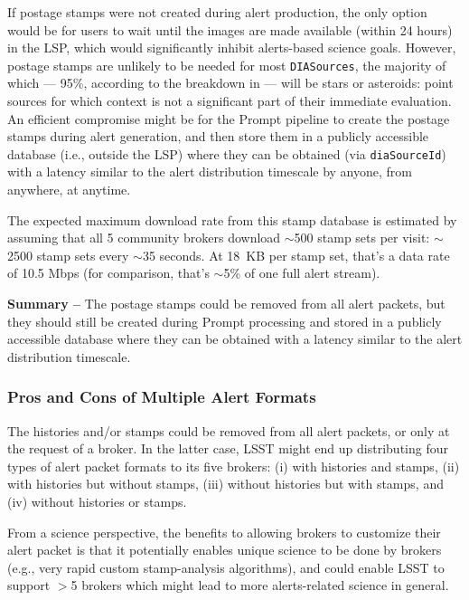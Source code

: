 \documentclass[DM,lsstdraft,authoryear,toc]{lsstdoc}
\begin{document}
If postage stamps were not created during alert production, the only option would be for users to wait until the images are made available (within 24 hours) in the LSP, which would significantly inhibit alerts-based science goals.
However, postage stamps are unlikely to be needed for most {\tt DIASources}, the majority of which --- 95\%, according to the breakdown in  --- will be stars or asteroids: point sources for which context is not a significant part of their immediate evaluation.
An efficient compromise might be for the Prompt pipeline to create the postage stamps during alert generation, and then store them in a publicly accessible database (i.e., outside the LSP) where they can be obtained (via {\tt diaSourceId}) with a latency similar to the alert distribution timescale by anyone, from anywhere, at anytime. 

The expected maximum download rate from this stamp database is estimated by assuming that all 5 community brokers download $\sim$500 stamp sets per visit: $\sim$2500 stamp sets every $\sim$35 seconds.
At 18~KB per stamp set, that's a data rate of 10.5 Mbps (for comparison, that's $\sim$5\% of one full alert stream).

{\bf Summary --} The postage stamps could be removed from all alert packets, but they should still be created during Prompt processing and stored in a publicly accessible database where they can be obtained with a latency similar to the alert distribution timescale.

\subsubsection{Pros and Cons of Multiple Alert Formats}\label{sssec:packets_remove_procon}

The histories and/or stamps could be removed from all alert packets, or only at the request of a broker.
In the latter case, LSST might end up distributing four types of alert packet formats to its five brokers: (i) with histories and stamps, (ii) with histories but without stamps, (iii) without histories but with stamps, and (iv) without histories or stamps. 

From a science perspective, the benefits to allowing brokers to customize their alert packet is that it potentially enables unique science to be done by brokers (e.g., very rapid custom stamp-analysis algorithms), and could enable LSST to support $>$5 brokers which might lead to more alerts-related science in general.
\end{document}
